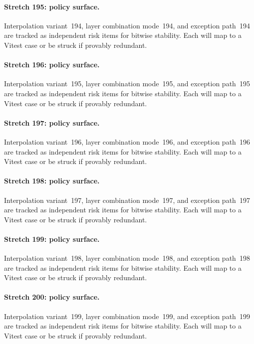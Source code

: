 \documentclass[sigconf,nonacm]{acmart}
\begin{document}
\paragraph{Stretch 195: policy surface.}
Interpolation variant~194, layer combination mode~194, and exception path~194 are tracked as independent risk items for bitwise stability. Each will map to a Vitest case or be struck if provably redundant. %

\paragraph{Stretch 196: policy surface.}
Interpolation variant~195, layer combination mode~195, and exception path~195 are tracked as independent risk items for bitwise stability. Each will map to a Vitest case or be struck if provably redundant. %

\paragraph{Stretch 197: policy surface.}
Interpolation variant~196, layer combination mode~196, and exception path~196 are tracked as independent risk items for bitwise stability. Each will map to a Vitest case or be struck if provably redundant. %

\paragraph{Stretch 198: policy surface.}
Interpolation variant~197, layer combination mode~197, and exception path~197 are tracked as independent risk items for bitwise stability. Each will map to a Vitest case or be struck if provably redundant. %

\paragraph{Stretch 199: policy surface.}
Interpolation variant~198, layer combination mode~198, and exception path~198 are tracked as independent risk items for bitwise stability. Each will map to a Vitest case or be struck if provably redundant. %

\paragraph{Stretch 200: policy surface.}
Interpolation variant~199, layer combination mode~199, and exception path~199 are tracked as independent risk items for bitwise stability. Each will map to a Vitest case or be struck if provably redundant. %
\end{document}
